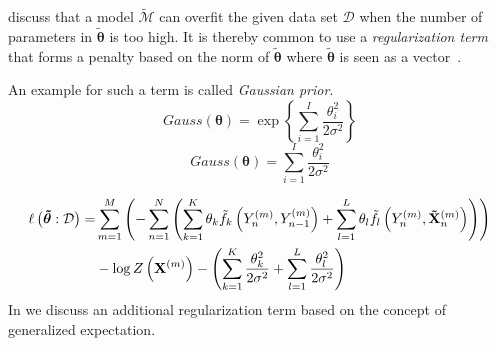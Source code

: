 \bigskip

\citet{sutton2010introduction} discuss that a model $\tilde{\mathcal{M}}$ can overfit the given data set $\mathcal{D}$ when the number of parameters in $\bm{\tilde{\theta}}$ is too high.
It is thereby common to use a \textit{regularization term} that forms a penalty based on the norm of $\bm{\tilde{\theta}}$ where $\bm{\tilde{\theta}}$ is seen as a vector~\citep{koller2009probabilistic,sutton2010introduction}.

An example for such a term is called \textit{Gaussian prior}.
\begin{equation}
  \label{equ:gaussian-prior}
  Gauss(\bm{\theta})=\exp\left\{\sum_{i=1}^I\frac{\theta_i^2}{2\sigma^2}\right\}
\end{equation}
\begin{equation}
  \label{equ:gaussian-prior}
  Gauss(\bm{\theta})=\sum_{i=1}^I\frac{\theta_i^2}{2\sigma^2}
\end{equation}

\begin{equation}
  \label{equ:log-likelihood-linear-chain-crf-log-linear-gaussian}
  \begin{split}
    \ell\left(\bm{\tilde{\theta}}:\mathcal{D}\right) = & \sum_{m=1}^M \left(-\sum_{n=1}^N \left(\sum_{k=1}^K\theta_k \tilde{f}_k\left(\vphantom{\tilde{X}}Y_n^{(m)},Y_{n-1}^{(m)}\right)+\sum_{l=1}^L\theta_l \tilde{f}_l\left(Y_n^{(m)},\mathbf{\tilde{X}}_n^{(m)}\right)\right)\right) \\
    & -\log Z\left(\mathbf{X}^{(m)}\right)-\left(\sum_{k=1}^K\frac{\theta_k^2}{2\sigma^2}+\sum_{l=1}^L\frac{\theta_l^2}{2\sigma^2}\right)
 \end{split}
\end{equation}
In  we discuss an additional regularization term based on the concept of \gls{generalized expectation}.

\bigskip

